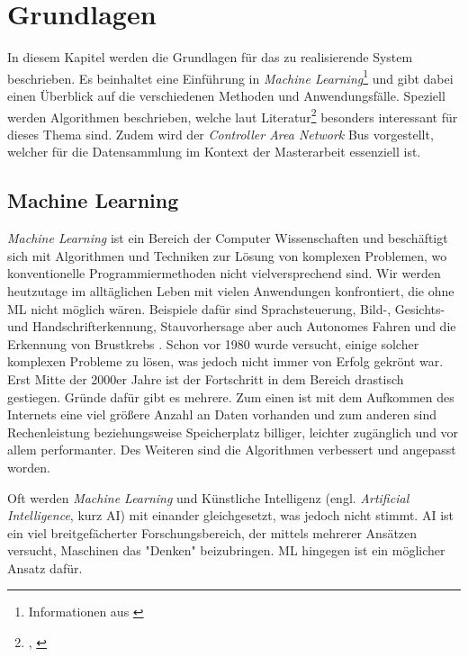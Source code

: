 %
%
%
%
%


\chapter{Grundlagen}
\label{chap:state_of_the_art}

In diesem Kapitel werden die Grundlagen für das zu realisierende System beschrieben. Es beinhaltet eine Einführung in \textit{Machine Learning}\footnote{Informationen aus \cite{Rebala2019}} und gibt dabei einen Überblick auf die verschiedenen Methoden und Anwendungsfälle. Speziell werden Algorithmen beschrieben, welche laut Literatur\footnote{\cite{Gahr2018}, \cite{Hallac2016}} besonders interessant für dieses Thema sind. Zudem wird der \textit{Controller Area Network} Bus vorgestellt, welcher für die Datensammlung im Kontext der Masterarbeit essenziell ist.

\section{Machine Learning}
\label{sec:machine_learning}

\textit{Machine Learning} ist ein Bereich der Computer Wissenschaften und beschäftigt sich mit Algorithmen und Techniken zur Lösung von komplexen Problemen, wo konventionelle Programmiermethoden nicht vielversprechend sind. Wir werden heutzutage im alltäglichen Leben mit vielen Anwendungen konfrontiert, die ohne ML nicht möglich wären. Beispiele dafür sind Sprachsteuerung, Bild-, Gesichts- und Handschrifterkennung, Stauvorhersage aber auch Autonomes Fahren und die Erkennung von Brustkrebs \cite{KOUROU20158}. Schon vor 1980 wurde versucht, einige solcher komplexen Probleme zu lösen, was jedoch nicht immer von Erfolg gekrönt war. Erst Mitte der 2000er Jahre ist der Fortschritt in dem Bereich drastisch gestiegen. Gründe dafür gibt es mehrere. Zum einen ist mit dem Aufkommen des Internets eine viel größere Anzahl an Daten vorhanden und zum anderen sind Rechenleistung beziehungsweise Speicherplatz billiger, leichter zugänglich und vor allem performanter. Des Weiteren sind die Algorithmen verbessert und angepasst worden.

Oft werden \textit{Machine Learning} und Künstliche Intelligenz (engl. \textit{Artificial Intelligence}, kurz AI) mit einander gleichgesetzt, was jedoch nicht stimmt. AI ist ein viel breitgefächerter Forschungsbereich, der mittels mehrerer Ansätzen versucht, Maschinen das "Denken" beizubringen. ML hingegen ist ein möglicher Ansatz dafür.

